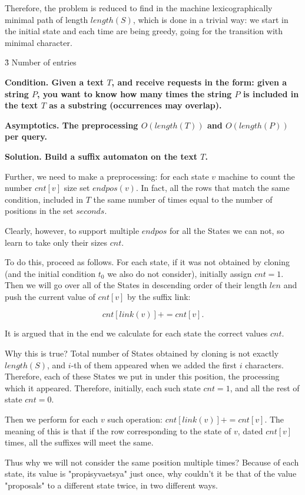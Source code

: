 Therefore, the problem is reduced to find in the machine lexicographically minimal path of length $length(S)$, which is done in a trivial way: we start in the initial state and each time are being greedy, going for the transition with minimal character.


\h3{ Number of entries }

\bf{Condition}. Given a text $T$, and receive requests in the form: given a string $P$, you want to know how many times the string $P$ is included in the text $T$ as a substring (occurrences may overlap).

\bf{Asymptotics}. The preprocessing $O (length (T))$ and $O (length (P))$ per query.

\bf{Solution}. Build a suffix automaton on the text $T$. 

Further, we need to make a preprocessing: for each state $v$ machine to count the number $cnt[v]$ size set $endpos(v)$. In fact, all the rows that match the same condition, included in $T$ the same number of times equal to the number of positions in the set $seconds$.

Clearly, however, to support multiple $endpos$ for all the States we can not, so learn to take only their sizes $cnt$.

To do this, proceed as follows. For each state, if it was not obtained by cloning (and the initial condition $t_0$ we also do not consider), initially assign $cnt = 1$. Then we will go over all of the States in descending order of their length $len$ and push the current value of $cnt[v]$ by the suffix link:

$$ cnt[link(v)] += cnt[v]. $$

It is argued that in the end we calculate for each state the correct values $cnt$.

Why this is true? Total number of States obtained by cloning is not exactly $length(S)$, and $i$-th of them appeared when we added the first $i$ characters. Therefore, each of these States we put in under this position, the processing which it appeared. Therefore, initially, each such state $cnt = 1$, and all the rest of state $cnt = 0$.

Then we perform for each $v$ such operation: $cnt[link(v)] += cnt[v]$. The meaning of this is that if the row corresponding to the state of $v$, dated $cnt[v]$ times, all the suffixes will meet the same.

Thus why we will not consider the same position multiple times? Because of each state, its value is "propisyvaetsya" just once, why couldn't it be that of the value "proposals" to a different state twice, in two different ways.

